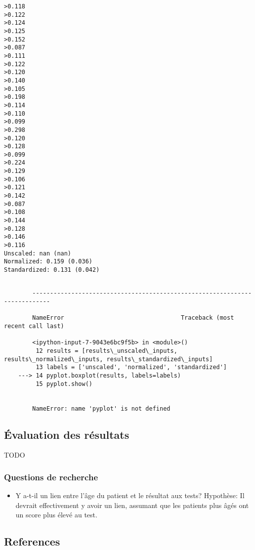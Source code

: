\documentclass[11pt]{article}
\providecommand{\tightlist}{%
      \setlength{\itemsep}{0pt}\setlength{\parskip}{0pt}}
\begin{document}
    \begin{Verbatim}[commandchars=\\\{\}]
>0.118
>0.122
>0.124
>0.125
>0.152
>0.087
>0.111
>0.122
>0.120
>0.140
>0.105
>0.198
>0.114
>0.110
>0.099
>0.298
>0.120
>0.128
>0.099
>0.224
>0.129
>0.106
>0.121
>0.142
>0.087
>0.108
>0.144
>0.128
>0.146
>0.116
Unscaled: nan (nan)
Normalized: 0.159 (0.036)
Standardized: 0.131 (0.042)

    \end{Verbatim}

    \begin{Verbatim}[commandchars=\\\{\}]

        ---------------------------------------------------------------------------

        NameError                                 Traceback (most recent call last)

        <ipython-input-7-9043e6bc9f5b> in <module>()
         12 results = [results\_unscaled\_inputs, results\_normalized\_inputs, results\_standardized\_inputs]
         13 labels = ['unscaled', 'normalized', 'standardized']
    ---> 14 pyplot.boxplot(results, labels=labels)
         15 pyplot.show()
    

        NameError: name 'pyplot' is not defined

    \end{Verbatim}

    \subsection{Évaluation des
résultats}\label{uxe9valuation-des-ruxe9sultats}

    TODO

    \subsubsection{Questions de recherche}\label{questions-de-recherche}

\begin{itemize}
\tightlist
\item
  Y a-t-il un lien entre l'âge du patient et le résultat aux tests?
  Hypothèse: Il devrait effectivement y avoir un lien, assumant que les
  patients plus âgés ont un score plus élevé au test.
\end{itemize}

    \subsection{References}\label{references}
\end{document}
